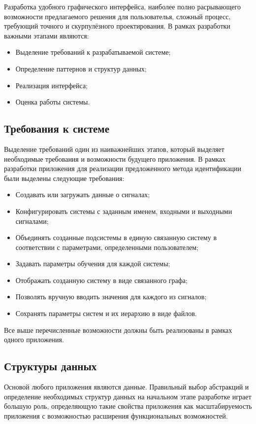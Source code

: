 Разработка удобного графического интерфейса, наиболее полно расрывающего
возможности предлагаемого решения для пользователья, сложный процесс, требующий
точного и скурпулёзного проектирования. В рамках разработки важными этапами
являются:

\begin{itemize}
  \item Выделение требований к разрабатываемой системе;
  \item Определение паттернов и структур данных;
  \item Реализация интерфейса;
  \item Оценка работы системы.
\end{itemize}

\subsection{Требования к системе}

Выделение требований один из наиважнейших этапов, который выделяет необходимые требования и возможности будущего приложения. В рамках разработки приложения для реализации предложенного метода идентификации были выделены следующие требования:

\begin{itemize}
  \item Создавать или загружать данные о сигналах;
  \item Конфигурировать системы с заданным именем, входными и выходными
    сигналами;
  \item Объединять созданные подсистемы в единую связанную систему в
    соответствии с параметрами, определенными пользователем;
  \item Задавать параметры обучения для каждой системы;
  \item Отображать созданную систему в виде связанного графа;
  \item Позволять вручную вводить значения для каждого из сигналов;
  \item Сохранять параметры систем и их иерархию в виде файлов.
\end{itemize}

Все выше перечисленные возможности должны быть реализованы в рамках одного приложения.


\subsection{Структуры данных}
Основой любого приложения являются данные. Правильный выбор абстракций и определение необходимых структур данных на начальном этапе разработке играет большую роль, определяющую такие свойства приложения как масштабируемость приложения с возможностью расширения функциональных возможностей. 


